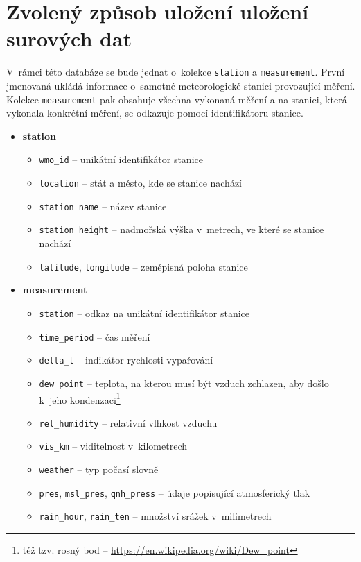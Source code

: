 \documentclass[10pt,a4paper,titlepage]{extarticle}
\begin{document}
\section{Zvolený způsob uložení uložení surových dat}\label{sec:zvoleny-zpusob-ulozeni-surovych-dat}
V~rámci této databáze se bude jednat o~kolekce \texttt{station} a \texttt{measurement}. První jmenovaná ukládá
informace o~samotné meteorologické stanici provozující měření.
Kolekce \texttt{measurement} pak obsahuje všechna vykonaná měření a na stanici,
která vykonala konkrétní měření, se odkazuje pomocí identifikátoru stanice.
\begin{itemize}
	\item \textbf{station}
	\begin{itemize}[label=\textperiodcentered]
    	\item \texttt{wmo\_id} -- unikátní identifikátor stanice
        \item \texttt{location} -- stát a město, kde se stanice nachází
        \item \texttt{station\_name} -- název stanice
        \item \texttt{station\_height} -- nadmořská výška v~metrech, ve které se stanice nachází
        \item \texttt{latitude}, \texttt{longitude} -- zeměpisná poloha stanice
    \end{itemize}
	\item \textbf{measurement}
	\begin{itemize}[label=\textperiodcentered]
        \item \texttt{station} -- odkaz na unikátní identifikátor stanice
        \item \texttt{time\_period} -- čas měření
        \item \texttt{delta\_t} -- indikátor rychlosti vypařování
        \item \texttt{dew\_point} -- teplota, na kterou musí být vzduch zchlazen, aby došlo k~jeho
        kondenzaci\footnote{též tzv. rosný bod -- \url{https://en.wikipedia.org/wiki/Dew\_point}}
        \item \texttt{rel\_humidity} -- relativní vlhkost vzduchu
        \item \texttt{vis\_km} -- viditelnost v~kilometrech
        \item \texttt{weather} -- typ počasí slovně
        \item \texttt{pres}, \texttt{msl\_pres}, \texttt{qnh\_press} -- údaje popisující atmosferický tlak
        \item \texttt{rain\_hour}, \texttt{rain\_ten} -- množství srážek v~milimetrech

\end{itemize}
\end{itemize}
\end{document}
